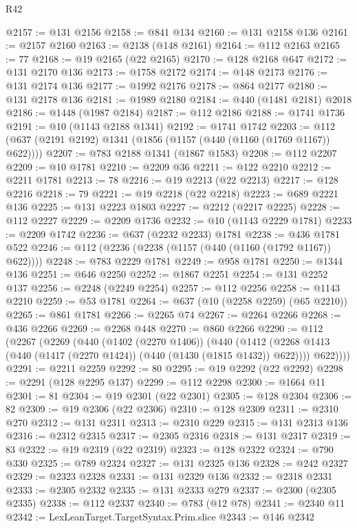 \begin{lexlean}{R42}
\begin{coremodule}
@2157 := @131 @2156
@2158 := @841 @134
@2160 := @131 @2158 @136
@2161 := @2157 @2160
@2163 := @2138 (@148 @2161)
@2164 := @112 @2163
@2165 := 77
@2168 := @19 @2165 (@22 @2165)
@2170 := @128 @2168 @647
@2172 := @131 @2170 @136
@2173 := @1758 @2172
@2174 := @148 @2173
@2176 := @131 @2174 @136
@2177 := @1992 @2176
@2178 := @864 @2177
@2180 := @131 @2178 @136
@2181 := @1989 @2180
@2184 := @440 (@1481 @2181) @2018
@2186 := @1448 (@1987 @2184)
@2187 := @112 @2186
@2188 := @1741 @1736
@2191 := @10 (@1143 @2188 @1341)
@2192 := @1741 @1742
@2203 := @112 (@637 (@2191 @2192) @1341 (@1856 (@1157 (@440 (@1160 (@1769 @1167)) @622))))
@2207 := @783 @2188 @1341 (@1867 @1583)
@2208 := @112 @2207
@2209 := @10 @1781
@2210 := @2209 @36
@2211 := @122 @2210
@2212 := @2211 @1781
@2213 := 78
@2216 := @19 @2213 (@22 @2213)
@2217 := @128 @2216
@2218 := 79
@2221 := @19 @2218 (@22 @2218)
@2223 := @689 @2221 @136
@2225 := @131 @2223 @1803
@2227 := @2212 (@2217 @2225)
@2228 := @112 @2227
@2229 := @2209 @1736
@2232 := @10 (@1143 @2229 @1781)
@2233 := @2209 @1742
@2236 := @637 (@2232 @2233) @1781
@2238 := @436 @1781 @522
@2246 := @112 (@2236 (@2238 (@1157 (@440 (@1160 (@1792 @1167)) @622))))
@2248 := @783 @2229 @1781
@2249 := @958 @1781
@2250 := @1344 @136
@2251 := @646 @2250
@2252 := @1867 @2251
@2254 := @131 @2252 @137
@2256 := @2248 (@2249 @2254)
@2257 := @112 @2256
@2258 := @1143 @2210
@2259 := @53 @1781
@2264 := @637 (@10 (@2258 @2259) (@65 @2210))
@2265 := @861 @1781
@2266 := @2265 @74
@2267 := @2264 @2266
@2268 := @436 @2266
@2269 := @2268 @448
@2270 := @860 @2266
@2290 := @112
    (@2267
      (@2269
        (@440
          (@1402 (@2270 @1406))
          (@440
            (@1412 (@2268 @1413 (@440 (@1417 (@2270 @1424)) (@440 (@1430 (@1815 @1432)) @622))))
            @622))))
@2291 := @2211 @2259
@2292 := 80
@2295 := @19 @2292 (@22 @2292)
@2298 := @2291 (@128 @2295 @137)
@2299 := @112 @2298
@2300 := @1664 @11
@2301 := 81
@2304 := @19 @2301 (@22 @2301)
@2305 := @128 @2304
@2306 := 82
@2309 := @19 @2306 (@22 @2306)
@2310 := @128 @2309
@2311 := @2310 @270
@2312 := @131 @2311
@2313 := @2310 @229
@2315 := @131 @2313 @136
@2316 := @2312 @2315
@2317 := @2305 @2316
@2318 := @131 @2317
@2319 := 83
@2322 := @19 @2319 (@22 @2319)
@2323 := @128 @2322
@2324 := @790 @330
@2325 := @789 @2324
@2327 := @131 @2325 @136
@2328 := @242 @2327
@2329 := @2323 @2328
@2331 := @131 @2329 @136
@2332 := @2318 @2331
@2333 := @2305 @2332
@2335 := @131 @2333 @279
@2337 := @2300 (@2305 @2335)
@2338 := @112 @2337
@2340 := @783 (@12 @78)
@2341 := @2340 @11
@2342 := LexLeanTarget.TargetSyntax.Prim.slice
@2343 := @146 @2342

\end{coremodule}
\end{lexlean}
